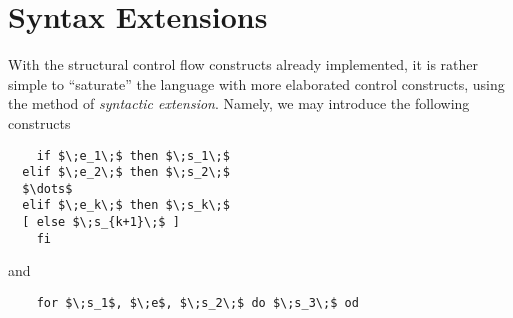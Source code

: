 \documentclass{article}
\def\transarrow{\xrightarrow}
\def\padding{\phantom{X}}
\def\subarrow{}
\newcommand{\trule}[2]{\frac{#1}{#2}}
\newcommand{\crule}[3]{\frac{#1}{#2},\;{#3}}
\newcommand{\withenv}[2]{{#1}\vdash{#2}}
\newcommand{\trans}[3]{{#1}\transarrow{\padding{\textstyle #2}\padding}\subarrow{#3}}
\newcommand{\llang}[1]{\mbox{\lstinline[mathescape]|#1|}}
\newcommand{\inbr}[1]{\left<{#1}\right>}
\newcommand{\ruleno}[1]{\eqno[\scriptsize\textsc{#1}]}
\newcommand{\sembr}[1]{\llbracket{#1}\rrbracket}
\theoremstyle{definition}
\begin{document}
\begin{comment}
\begin{figure}[t]
  \[\trule{\withenv{P}{\trans{c}{p}{c^\prime}}}{\withenv{P}{\trans{c}{(\llang{LABEL $\;l$})p}{c^\prime}}}\ruleno{Label$_{SM}$}\]
  \[\trule{\withenv{P}{\trans{c}{P[l]}{c^\prime}}}{\withenv{P}{\trans{c}{(\llang{JMP $\;l$})p}{c^\prime}}}\ruleno{JMP$_{SM}$}\]
  \[\crule{\withenv{P}{\trans{c}{P[l]}{c^\prime}}}{\withenv{P}{\trans{\inbr{z::st, c}}{(\llang{CJMP$_{nz}$ $\;l$})p}{c^\prime}}}{z\ne 0}\ruleno{CJMP$_{nz}^+$$_{SM}$}\]
  \[\crule{\withenv{P}{\trans{c}{p}{c^\prime}}}{\withenv{P}{\trans{\inbr{z::st, c}}{(\llang{CJMP$_{nz}$ $\;l$})p}{c^\prime}}}{z = 0}\ruleno{CJMP$_{nz}^-$$_{SM}$}\]
  \[\crule{\withenv{P}{\trans{c}{P[l]}{c^\prime}}}{\withenv{P}{\trans{\inbr{z::st, c}}{(\llang{CJMP$_z$ $\;l$})p}{c^\prime}}}{z = 0}\ruleno{CJMP$_{z}^+$$_{SM}$}\]
  \[\crule{\withenv{P}{\trans{c}{p}{c^\prime}}}{\withenv{P}{\trans{\inbr{z::st, c}}{(\llang{CJMP$_z$ $\;l$})p}{c^\prime}}}{z \ne 0}\ruleno{CJMP$_{z}^-$$_{SM}$}\]  
  \caption{Big-step operational semantics for extended stack machine}
  \label{bs_sm_cc}
\end{figure}

Finally, the top-level semantics for the extended stack machine can be redefined as follows:

\[
\forall p\in\mathscr P,\,\forall i\in\mathbb Z^*\;:\;\sembr{p}_{SM}\;i=o\Leftrightarrow\withenv{p}{\trans{\inbr{\epsilon, \inbr{\lambda, i, \epsilon}}}{p}{\inbr{\_, \inbr{\_, \_, o}}}}
\]
\end{comment}

\section{Syntax Extensions}

With the structural control flow constructs already implemented, it is rather simple to ``saturate'' the language with more elaborated control constructs, using
the method of \emph{syntactic extension}. Namely, we may introduce the following constructs

\begin{lstlisting}
    if $\;e_1\;$ then $\;s_1\;$
  elif $\;e_2\;$ then $\;s_2\;$
  $\dots$
  elif $\;e_k\;$ then $\;s_k\;$
  [ else $\;s_{k+1}\;$ ]
    fi
\end{lstlisting}

and

\begin{lstlisting}
    for $\;s_1$, $\;e$, $\;s_2\;$ do $\;s_3\;$ od
\end{lstlisting}
\end{document}
